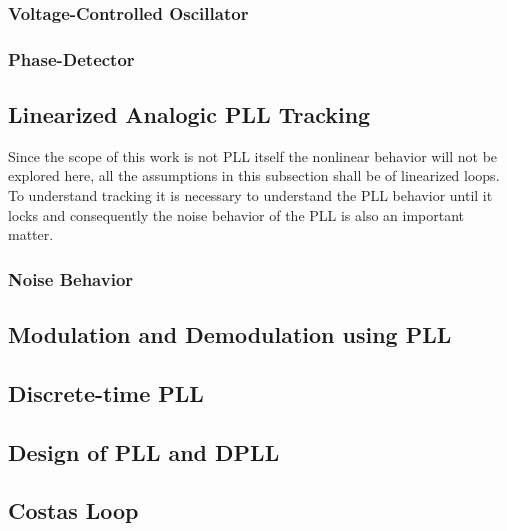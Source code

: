 \subsubsection{Voltage-Controlled Oscillator}

\subsubsection{Phase-Detector}

\subsection{Linearized Analogic PLL Tracking}
Since the scope of this work is not PLL itself the nonlinear behavior will not
be explored here, all the assumptions in this subsection shall be of linearized
loops.\\
To understand tracking it is necessary to understand the PLL behavior until it
locks and consequently the noise behavior of the PLL is also an important
matter.\\
\subsubsection{Noise Behavior}


\subsection{Modulation and Demodulation using PLL}

\subsection{Discrete-time PLL}

\subsection{Design of PLL and DPLL}

\subsection{Costas Loop}

